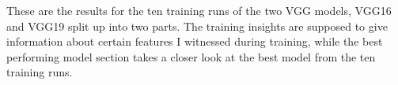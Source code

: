 These are the results for the ten training runs of the two VGG models, VGG16 and VGG19 split up into two parts. The training insights are supposed to give information about certain features I witnessed during training, while the best performing model section takes a closer look at the best model from the ten training runs.